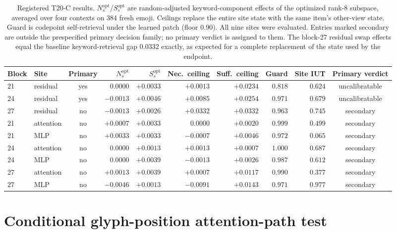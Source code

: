 \documentclass{article}
\begin{document}
\begin{table}[H]
\centering
\scriptsize
\setlength{\tabcolsep}{3pt}
\begin{tabular}{llcrrrrrrc}
\toprule
Block & Site & Primary & $N^{\mathrm{opt}}_s$ & $S^{\mathrm{opt}}_s$ & Nec.\ ceiling & Suff.\ ceiling & Guard & Site IUT & Primary verdict \\
\midrule
21 & residual  & yes & $0.0000$  & $+0.0033$ & $+0.0013$ & $+0.0234$ & $0.818$ & $0.624$ & uncalibratable \\
24 & residual  & yes & $-0.0013$ & $+0.0046$ & $+0.0085$ & $+0.0254$ & $0.971$ & $0.679$ & uncalibratable \\
27 & residual  & no  & $-0.0013$ & $+0.0026$ & $+0.0332$ & $+0.0332$ & $0.963$ & $0.745$ & secondary \\
21 & attention & no  & $+0.0007$ & $+0.0033$ & $0.0000$  & $+0.0020$ & $0.999$ & $0.499$ & secondary \\
21 & MLP       & no  & $+0.0033$ & $+0.0033$ & $-0.0007$ & $+0.0046$ & $0.972$ & $0.065$ & secondary \\
24 & attention & no  & $0.0000$  & $+0.0013$ & $+0.0013$ & $+0.0007$ & $1.000$ & $0.687$ & secondary \\
24 & MLP       & no  & $0.0000$  & $+0.0039$ & $-0.0013$ & $+0.0026$ & $0.987$ & $0.612$ & secondary \\
27 & attention & no  & $+0.0013$ & $+0.0039$ & $+0.0007$ & $+0.0117$ & $0.990$ & $0.377$ & secondary \\
27 & MLP       & no  & $-0.0046$ & $+0.0013$ & $-0.0091$ & $+0.0143$ & $0.971$ & $0.977$ & secondary \\
\bottomrule
\end{tabular}
\caption{Registered T20-C results. $N^{\mathrm{opt}}_s$/$S^{\mathrm{opt}}_s$
are random-adjusted keyword-component effects of the optimized rank-8
subspace, averaged over four contexts on 384 fresh emoji. Ceilings replace
the entire site state with the same item's other-view state. Guard is
codepoint self-retrieval under the learned patch (floor $0.90$). All nine sites
were evaluated. Entries marked secondary are outside the prespecified primary
decision family; no primary verdict is assigned to them. The block-27 residual
swap effects equal the baseline keyword-retrieval gap $0.0332$ exactly, as
expected for a complete replacement of the state used by the endpoint.}
\label{tab:t20}
\end{table}

\section{Conditional glyph-position attention-path test}
\label{app:t21}
\end{document}
